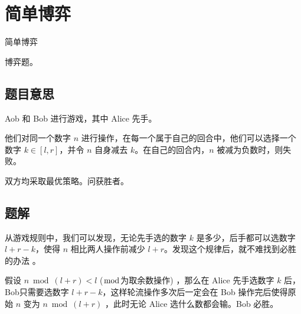 \def\sectionName{简单博弈}
\section{\sectionName}



\begin{frame}

\isBeamerMode\relax
    {\Huge \sectionName}\par
\fi




博弈题。



\end{frame}

\subsection{题目意思}
\begin{frame} %
Aob 和 Bob 进行游戏，其中 Alice 先手。

他们对同一个数字 $n$ 进行操作，在每一个属于自己的回合中，他们可以选择一个数字 $k
\in [l, r]$，并令 $n$ 自身减去 $k$。在自己的回合内，$n$ 被减为负数时，则失败。

双方均采取最优策略。问获胜者。
\end{frame}



\subsection{题解}
\begin{frame} %
从游戏规则中，我们可以发现，无论先手选的数字 $k$ 是多少，后手都可以选数字 $l + r
- k$，使得 $n$ 相比两人操作前减少 $l + r$。发现这个规律后，就不难找到必胜的办法
。

假设 $n \bmod (l + r) < l$  ($\bmod$为取余数操作) ，那么在 Alice 先手选数字 $k$
后，Bob只需要选数字 $l + r - k$，这样轮流操作多次后一定会在 Bob 操作完后使得原始
$n$ 变为 $n \bmod (l + r)$ ，此时无论 Alice 选什么数都会输。Bob 必胜。
\end{frame}


